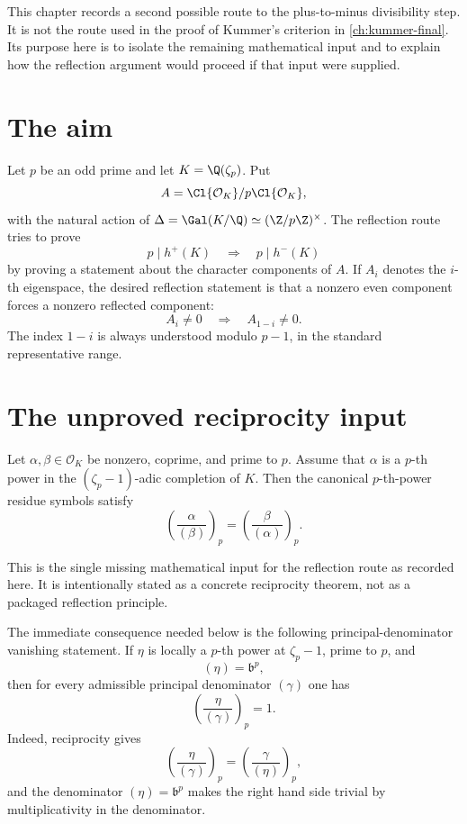 
This chapter records a second possible route to the plus-to-minus divisibility
step.  It is not the route used in the proof of Kummer's criterion in
\cref{ch:kummer-final}.  Its purpose here is to isolate the remaining
mathematical input and to explain how the reflection argument would proceed if
that input were supplied.

\section{The aim}

Let \(p\) be an odd prime and let \(K=\Q(\zeta_p)\).  Put
\[
  A=\Cl{\mathcal O_K}/p\Cl{\mathcal O_K},
\]
with the natural action of
\(\Delta=\Gal(K/\Q)\simeq(\Z/p\Z)^\times\).  The reflection route tries to
prove
\[
  p\mid h^+(K)\quad\Longrightarrow\quad p\mid h^-(K)
\]
by proving a statement about the character components of \(A\).  If
\(A_i\) denotes the \(i\)-th eigenspace, the desired reflection statement is
that a nonzero even component forces a nonzero reflected component:
\[
  A_i\ne0 \quad\Longrightarrow\quad A_{1-i}\ne0.
\]
The index \(1-i\) is always understood modulo \(p-1\), in the standard
representative range.

\section{The unproved reciprocity input}

\begin{theorem}
  \label{thm:abandoned-oskr}
  \notready
Let \(\alpha,\beta\in\mathcal O_K\) be nonzero, coprime, and prime to \(p\).
Assume that \(\alpha\) is a \(p\)-th power in the
\((\zeta_p-1)\)-adic completion of \(K\).  Then the canonical
\(p\)-th-power residue symbols satisfy
\[
  \left(\frac{\alpha}{(\beta)}\right)_p
  =
  \left(\frac{\beta}{(\alpha)}\right)_p.
\]
\end{theorem}

This is the single missing mathematical input for the reflection route as
recorded here.  It is intentionally stated as a concrete reciprocity theorem,
not as a packaged reflection principle.

The immediate consequence needed below is the following principal-denominator
vanishing statement.  If \(\eta\) is locally a \(p\)-th power at
\(\zeta_p-1\), prime to \(p\), and
\[
  (\eta)=\mathfrak b^p,
\]
then for every admissible principal denominator \((\gamma)\) one has
\[
  \left(\frac{\eta}{(\gamma)}\right)_p=1.
\]
Indeed, reciprocity gives
\[
  \left(\frac{\eta}{(\gamma)}\right)_p
  =
  \left(\frac{\gamma}{(\eta)}\right)_p,
\]
and the denominator \((\eta)=\mathfrak b^p\) makes the right hand side
trivial by multiplicativity in the denominator.

